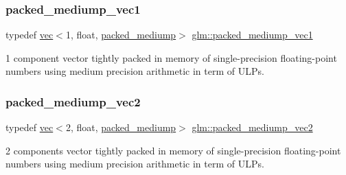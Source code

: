 \subsubsection{\texorpdfstring{packed\+\_\+mediump\+\_\+vec1}{packed\_mediump\_vec1}}
{\footnotesize\ttfamily typedef \mbox{\hyperlink{structglm_1_1vec}{vec}}$<$1, float, \mbox{\hyperlink{namespaceglm_a36ed105b07c7746804d7fdc7cc90ff25a9604654c3b137cd7898689fd34b25bc0}{packed\+\_\+mediump}}$>$ \mbox{\hyperlink{group__gtc__type__aligned_gadf62fccc1514b0dca7ab1067263fca4c}{glm\+::packed\+\_\+mediump\+\_\+vec1}}}



1 component vector tightly packed in memory of single-\/precision floating-\/point numbers using medium precision arithmetic in term of U\+L\+Ps. 

\mbox{\label{group__gtc__type__aligned_ga16f6a2ad499160b96c263f7f216a70e2}} 
\subsubsection{\texorpdfstring{packed\+\_\+mediump\+\_\+vec2}{packed\_mediump\_vec2}}
{\footnotesize\ttfamily typedef \mbox{\hyperlink{structglm_1_1vec}{vec}}$<$2, float, \mbox{\hyperlink{namespaceglm_a36ed105b07c7746804d7fdc7cc90ff25a9604654c3b137cd7898689fd34b25bc0}{packed\+\_\+mediump}}$>$ \mbox{\hyperlink{group__gtc__type__aligned_ga16f6a2ad499160b96c263f7f216a70e2}{glm\+::packed\+\_\+mediump\+\_\+vec2}}}



2 components vector tightly packed in memory of single-\/precision floating-\/point numbers using medium precision arithmetic in term of U\+L\+Ps. 

\mbox{\label{group__gtc__type__aligned_ga34ad82503f637918457284618bef3a82}} 
